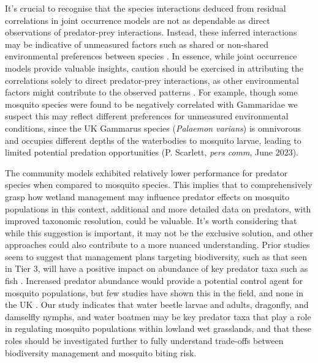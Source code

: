 \documentclass[lineno,sn-basic]{sn-jnl}%
\begin{document}
It's crucial to recognise that the species interactions deduced from residual correlations in joint occurrence models are not as dependable as direct observations of predator-prey interactions. Instead, these inferred interactions may be indicative of unmeasured factors such as shared or non-shared environmental preferences between species \citep{poggiatoInterpretationsJointModeling2021}. In essence, while joint occurrence models provide valuable insights, caution should be exercised in attributing the correlations solely to direct predator-prey interactions, as other environmental factors might contribute to the observed patterns \citep{zurellJointSpeciesDistribution2018}. For example, though some mosquito species were found to be negatively correlated with Gammaridae we suspect this may reflect different preferences for unmeasured environmental conditions, since the UK Gammarus species (\textit{Palaemon varians}) is omnivorous and occupies different depths of the waterbodies to mosquito larvae, leading to limited potential predation opportunities (P. Scarlett, \textit{pers comm}, June 2023).

The community models exhibited relatively lower performance for predator species when compared to mosquito species. This implies that to comprehensively grasp how wetland management may influence predator effects on mosquito populations in this context, additional and more detailed data on predators, with improved taxonomic resolution, could be valuable. It's worth considering that while this suggestion is important, it may not be the exclusive solution, and other approaches could also contribute to a more nuanced understanding. Prior studies seem to suggest that management plans targeting biodiversity, such as that seen in Tier 3, will have a positive impact on abundance of key predator taxa such as fish \citep{chandraMosquitoControlLarvivorous2008a, griffinReviewRoleFish2012}. Increased predator abundance would provide a potential control agent for mosquito populations, but few studies have shown this in the field, and none in the UK \citep{griffinReviewRoleFish2012, medlockNaturalPredatorsParasites2008, sahaPredationPotentialOdonates2012}. Our study indicates that water beetle larvae and adults, dragonfly, and damselfly nymphs, and water boatmen may be key predator taxa that play a role in regulating mosquito populations within lowland wet grasslands, and that these roles should be investigated further to fully understand trade-offs between biodiversity management and mosquito biting risk. 
\end{document}
